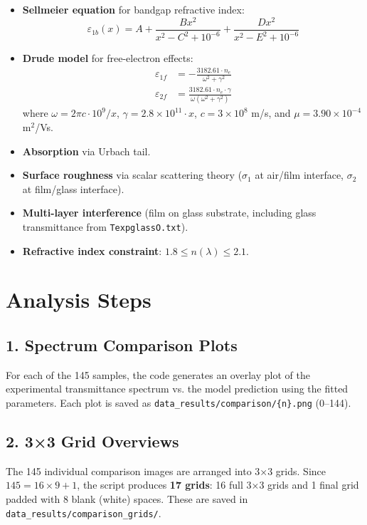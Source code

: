\documentclass[11pt,a4paper]{article}
\begin{document}
\begin{itemize}
    \item \textbf{Sellmeier equation} for bandgap refractive index:
    \begin{equation*}
        \varepsilon_{1b}(x) = A + \frac{B x^2}{x^2 - C^2 + 10^{-6}} + \frac{D x^2}{x^2 - E^2 + 10^{-6}}
    \end{equation*}
    \item \textbf{Drude model} for free-electron effects:
    \begin{align*}
        \varepsilon_{1f} &= -\frac{3182.61 \cdot n_e}{\omega^2 + \gamma^2} \\
        \varepsilon_{2f} &= \frac{3182.61 \cdot n_e \cdot \gamma}{\omega (\omega^2 + \gamma^2)}
    \end{align*}
    where $\omega = 2\pi c \cdot 10^9 / x$, $\gamma = 2.8 \times 10^{11} \cdot x$, $c = 3 \times 10^8$ m/s, and $\mu = 3.90 \times 10^{-4}$ m$^2$/Vs.
    \item \textbf{Absorption} via Urbach tail.
    \item \textbf{Surface roughness} via scalar scattering theory ($\sigma_1$ at air/film interface, $\sigma_2$ at film/glass interface).
    \item \textbf{Multi-layer interference} (film on glass substrate, including glass transmittance from {\tt TexpglassO.txt}).
    \item \textbf{Refractive index constraint}: $1.8 \leq n(\lambda) \leq 2.1$.
\end{itemize}

\section{Analysis Steps}

\subsection{1. Spectrum Comparison Plots}
For each of the 145 samples, the code generates an overlay plot of the experimental transmittance spectrum vs. the model prediction using the fitted parameters. Each plot is saved as {\tt data\_results/comparison/\{n\}.png} (0--144).

\subsection{2. 3×3 Grid Overviews}
The 145 individual comparison images are arranged into 3×3 grids. Since $145 = 16 \times 9 + 1$, the script produces \textbf{17 grids}: 16 full 3×3 grids and 1 final grid padded with 8 blank (white) spaces. These are saved in {\tt data\_results/comparison\_grids/}.
\end{document}
